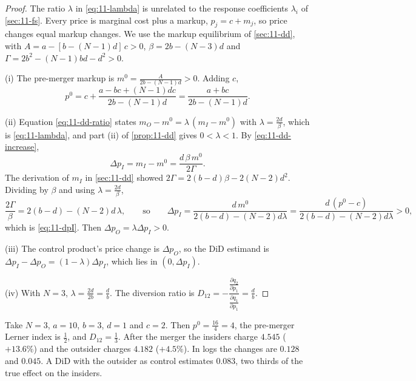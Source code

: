 \begin{proof}
The ratio $\lambda$ in \eqref{eq:11-lambda} is unrelated to the response coefficients $\lambda_i$ of
\cref{sec:11-fs}. Every price is marginal cost plus a markup, $p_j=c+m_j$, so price changes equal markup changes. We use the markup
equilibrium of \cref{sec:11-dd}, with $A=a-[b-(N-1)d]\,c>0$, $\beta=2b-(N-3)d$ and
$\Gamma=2b^2-(N-1)bd-d^2>0$.

(i) The pre-merger markup is $m^0=\frac{A}{2b-(N-1)d}>0$. Adding $c$,
\begin{equation*}
p^0=c+\frac{a-bc+(N-1)dc}{2b-(N-1)d}=\frac{a+bc}{2b-(N-1)d}.
\end{equation*}

(ii) Equation \eqref{eq:11-dd-ratio} states $m_O-m^0=\lambda\,(m_I-m^0)$ with $\lambda=\frac{2d}{\beta}$, which is
\eqref{eq:11-lambda}, and part (ii) of \cref{prop:11-dd} gives $0<\lambda<1$. By \eqref{eq:11-dd-increase},
\begin{equation*}
\Delta p_I=m_I-m^0=\frac{d\,\beta\,m^0}{2\Gamma}.
\end{equation*}
The derivation of $m_I$ in \cref{sec:11-dd} showed $2\Gamma=2(b-d)\beta-2(N-2)d^2$. Dividing by $\beta$ and using
$\lambda=\frac{2d}{\beta}$,
\begin{equation*}
\frac{2\Gamma}{\beta}=2(b-d)-(N-2)d\,\lambda,
\qquad\text{so}\qquad
\Delta p_I=\frac{d\,m^0}{2(b-d)-(N-2)d\lambda}=\frac{d\,(p^0-c)}{2(b-d)-(N-2)d\lambda}>0,
\end{equation*}
which is \eqref{eq:11-dpI}. Then $\Delta p_O=\lambda\Delta p_I>0$.

(iii) The control product's price change is $\Delta p_O$, so the DiD estimand is
$\Delta p_I-\Delta p_O=(1-\lambda)\Delta p_I$, which lies in $(0,\Delta p_I)$.

(iv) With $N=3$, $\lambda=\frac{2d}{2b}=\frac{d}{b}$. The diversion ratio is
$D_{12}=-\dfrac{\frac{\partial q_2}{\partial p_1}}{\frac{\partial q_1}{\partial p_1}}=\frac{d}{b}$.
\end{proof}

\begin{example}\label{ex:11-didbias}
Take $N=3$, $a=10$, $b=3$, $d=1$ and $c=2$. Then $p^0=\frac{16}{4}=4$, the pre-merger Lerner index is
$\frac{1}{2}$, and $D_{12}=\frac{1}{3}$. After the merger the insiders charge $4.545$ ($+13.6\%$) and the outsider
charges $4.182$ ($+4.5\%$). In logs the changes are $0.128$ and $0.045$. A DiD with the outsider as control
estimates $0.083$, two thirds of the true effect on the insiders.
\end{example}

